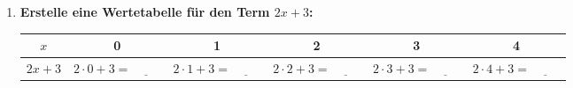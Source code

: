 \begin{enumerate}[label=\arabic*.]
    \item \textbf{Erstelle eine Wertetabelle für den Term $2x + 3$:}
    \vspace{0.5cm}

    \begin{flushleft}
        \begin{tabular}{|c|c|c|c|c|c|}
            \hline
            $x$ & 0 & 1 & 2 & 3 & 4 \\
            \hline
            $2x + 3$ & $2 \cdot 0 + 3 = \underline{\hspace{1cm}}$ & $2 \cdot 1 + 3 = \underline{\hspace{1cm}}$ & $2 \cdot 2 + 3 = \underline{\hspace{1cm}}$ & $2 \cdot 3 + 3 = \underline{\hspace{1cm}}$ & $2 \cdot 4 + 3 = \underline{\hspace{1cm}}$ \\
            \hline
        \end{tabular}
    \end{flushleft}
\end{enumerate}
